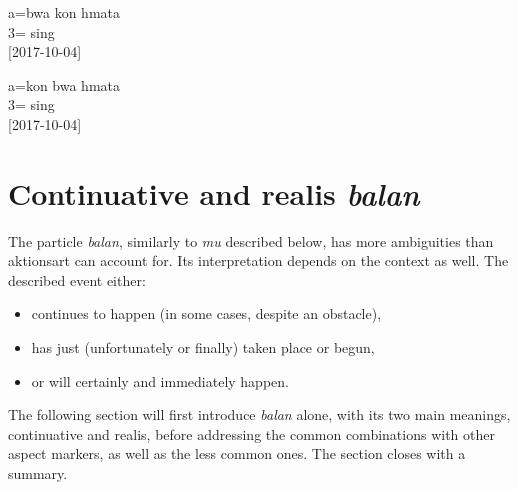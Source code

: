 	\ea\label{ex:bwa_kon_hmata}
	\gll a=bwa kon hmata\\
	 3=  sing\\
	\glt {} {[2017-10-04]}
	 \z
	
	\ea\label{ex:kon_bwa_hmata}
	\gll a=kon bwa hmata\\
	 3=  sing\\
	\glt {} {[2017-10-04]}
	\z


%
%

 
 \section{Continuative and realis \textit{balan}}
 \label{sec:balan}
 

The particle \textit{balan}, similarly to \textit{mu} described below, has more ambiguities than aktionsart can account for. Its interpretation depends on the context as well. The described event either: 

\begin{itemize}
	\item continues to happen (in some cases, despite an obstacle), 
	\item has just (unfortunately or finally) taken place or begun, 
	\item or will certainly and immediately happen.
\end{itemize}
 
\noindent The following section will first introduce \textit{balan} alone, with its two main meanings, continuative and realis, before addressing the common combinations with other aspect markers, as well as the less common ones. The section closes with a summary.
 
